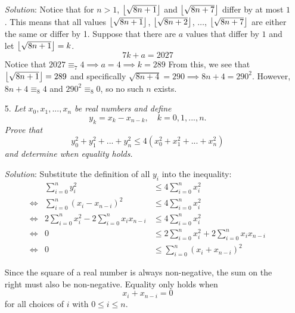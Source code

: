 \documentclass{article}
\begin{document}
\begin{enumerate}[1.]
\textit{Solution}:
Notice that for $n > 1$, $\left\lfloor\sqrt{8n + 1}\right\rfloor$ and $\left\lfloor\sqrt{8n + 7}\right\rfloor$ differ by at most $1$. This means that all values $\left\lfloor\sqrt{8n + 1}\right\rfloor$, $\left\lfloor\sqrt{8n + 2}\right\rfloor$, $\dots$, $\left\lfloor\sqrt{8n + 7}\right\rfloor$ are either the same or differ by 1. Suppose that there are $a$ values that differ by $1$ and let $\left\lfloor\sqrt{8n + 1}\right\rfloor = k$.
$$7k + a = 2027$$
Notice that $2027 \equiv _7 4 \implies a = 4 \implies k = 289$ From this, we see that $\left\lfloor\sqrt{8n + 1}\right\rfloor = 289$ and specifically $\sqrt{8n + 4} = 290 \implies 8n + 4 = 290^2$. However, $8n + 4 \equiv _8 4$ and $290^2 \equiv _8 0$, so no such $n$ exists.

\item[5.] %
\textit{
Let $x_0, x_1,..., x_n$ be real numbers and define
\[y_k=x_k-x_{n-k}, \quad k=0,1,...,n.\]
Prove that 
\[y_0^2 + y_1^2+...+ y_n^2 \leq 4(x_0^2 + x_1^2 + ... + x_n^2) \]
and determine when equality holds.
}

\textit{Solution}: 
Substitute the definition of all $y_i$ into the inequality:
\begin{align*}
  &&\sum_{i = 0}^{n}y_i^2 &\leq 4\sum_{i = 0}^{n}x_i^2 &\\
  &\iff& \sum_{i = 0}^{n}(x_i - x_{n - i})^2 &\leq 4\sum_{i = 0}^{n}x_i^2 &\\
  &\iff& 2\sum_{i = 0}^{n}x_i^2 - 2\sum_{i = 0}^{n}x_ix_{n - i} &\leq 4\sum_{i = 0}^{n}x_i^2& \\
  &\iff& 0 &\leq 2\sum_{i = 0}^{n}x_i^2 + 2\sum_{i = 0}^{n}x_ix_{n - i} \\
  &\iff& 0 &\leq \sum_{i = 0}^{n}(x_i + x_{n - i})^2 &
\end{align*}

Since the square of a real number is always non-negative, the sum on the right must also be non-negative. Equality only holds when
$$x_i + x_{n - i} = 0$$
for all choices of $i$ with $0 \le i \le n$.

\end{enumerate}
\end{document}
